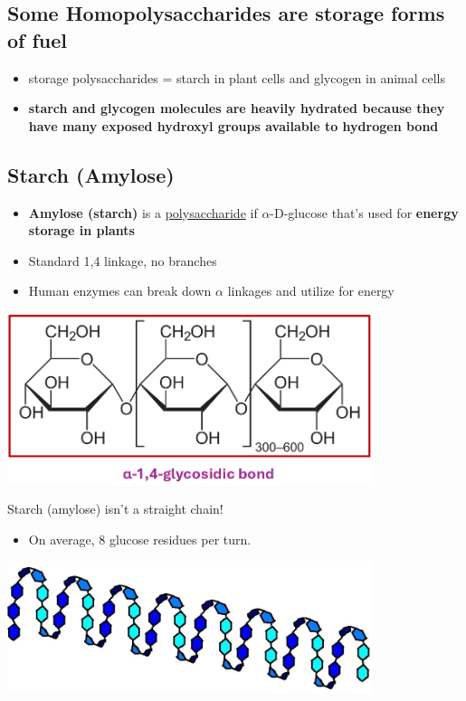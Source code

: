 \documentclass[10pt]{article}
\begin{document}
\subsection*{Some Homopolysaccharides are storage forms of fuel}
\begin{itemize}
    \item storage polysaccharides = starch in plant cells and glycogen in animal cells
    \item \textbf{starch and glycogen molecules are heavily hydrated because they have many exposed hydroxyl groups available to hydrogen bond}
\end{itemize}

\subsection*{Starch (Amylose)}
\begin{itemize}
    \item \textbf{Amylose (starch)} is a \underline{polysaccharide} if $\alpha$-D-glucose that's used for \textbf{energy storage in plants}
    \item Standard 1,4 linkage, no branches
    \item Human enzymes can break down $\alpha$ linkages and utilize for energy
\end{itemize}
\begin{center}
    \includegraphics*[width=0.8\textwidth]{L1_17.png}
\end{center}
Starch (amylose) isn't a straight chain!
\begin{itemize}
    \item On average, 8 glucose residues per turn.
\end{itemize}
\begin{center}
    \includegraphics*[width=0.8\textwidth]{L1_18.png}
\end{center}
\end{document}

